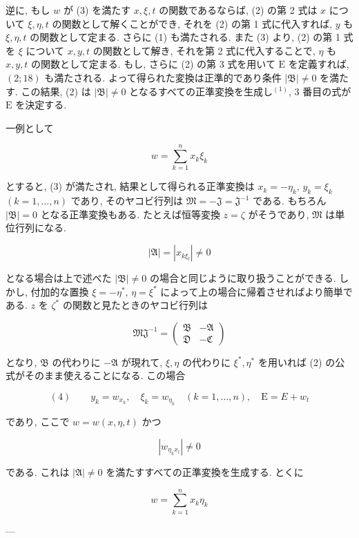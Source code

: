 \documentclass[dvipdfmx, leqno]{jsbook}
\begin{document}
逆に, もし $w$ が (3) を満たす $x, \xi, t$ の関数であるならば, (2) の第 2 式は $x$ について $\xi, \eta, t$ の関数として解くことができ, それを (2) の第 1 式に代入すれば, $y$ も $\xi, \eta, t$ の関数として定まる. さらに (1) も満たされる. また (3) より, (2) の第 1 式を $\xi$ について $x, y, t$ の関数として解き, それを第 2 式に代入することで, $\eta$ も $x, y, t$ の関数として定まる. もし, さらに (2) の第 3 式を用いて $\mathrm{E}$ を定義すれば, $(2;18)$ も満たされる. よって得られた変換は正準的であり条件 $|\mathfrak{B}| \neq 0$ を満たす. この結果, (2) は $|\mathfrak{B}| \neq 0$ となるすべての正準変換を生成し$^{(1)}$, 3 番目の式が $\mathrm{E}$ を決定する.

一例として

$$w = \sum_{k=1}^{n} x_k \xi_k$$

とすると, (3) が満たされ, 結果として得られる正準変換は $x_k = -\eta_k, \, y_k = \xi_k$ $(k=1,\dots,n)$ であり, そのヤコビ行列は $\mathfrak{M} = -\mathfrak{J} = \mathfrak{J}^{-1}$ である. もちろん $|\mathfrak{B}| = 0$ となる正準変換もある. たとえば恒等変換 $z = \zeta$ がそうであり, $\mathfrak{M}$ は単位行列になる.

$$|\mathfrak{A}| = |x_{k\xi_l}| \neq 0$$

となる場合は上で述べた $|\mathfrak{B}| \neq 0$ の場合と同じように取り扱うことができる. しかし, 付加的な置換 $\xi = -\eta^*, \, \eta = \xi^*$ によって上の場合に帰着させればより簡単である. $z$ を $\zeta^*$ の関数と見たときのヤコビ行列は

$$\mathfrak{M}\mathfrak{J}^{-1} = \begin{pmatrix} \mathfrak{B} & -\mathfrak{A} \\ \mathfrak{D} & -\mathfrak{C} \end{pmatrix}$$

となり, $\mathfrak{B}$ の代わりに $-\mathfrak{A}$ が現れて, $\xi, \eta$ の代わりに $\xi^*, \eta^*$ を用いれば (2) の公式がそのまま使えることになる. この場合

$$(4) \qquad y_k = w_{x_k}, \quad \xi_k = w_{\eta_k} \quad (k=1,\dots,n), \quad \mathrm{E} = E + w_t$$

であり, ここで $w = w(x, \eta, t)$ かつ

$$|w_{\eta_k x_l}| \neq 0$$

である. これは $|\mathfrak{A}| \neq 0$ を満たすすべての正準変換を生成する. とくに

$$w = \sum_{k=1}^{n} x_k \eta_k$$

---

\end{document}
